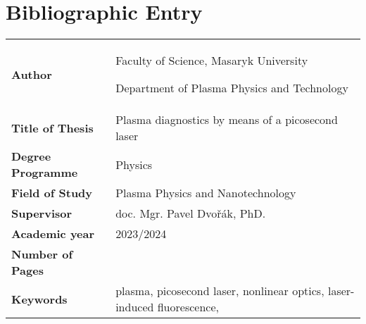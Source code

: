 \chapter*{Bibliographic Entry}
\thispagestyle{empty}
\bgroup
\renewcommand{\arraystretch}{\bibentryspacing}
\begin{tabularx}{\textwidth}{l X}
	\textbf{Author}           & \theauthor\par
	                            Faculty of Science, Masaryk University\par
	                            Department of Plasma Physics and Technology \\
	\textbf{Title of Thesis}  & Plasma diagnostics by means of a picosecond laser \\
	\textbf{Degree Programme} & Physics \\
	\textbf{Field of Study}   & Plasma Physics and Nanotechnology \\
	\textbf{Supervisor}       & doc. Mgr. Pavel Dvořák, PhD. \\
	\textbf{Academic year}    & 2023/2024 \\
	\textbf{Number of Pages}  & \pageref*{lastpage} \\
	\textbf{Keywords}         & plasma, picosecond laser,
	                            nonlinear optics,
	                            laser-induced fluorescence,
	                            \EFISH{} \\
\end{tabularx}
\egroup

